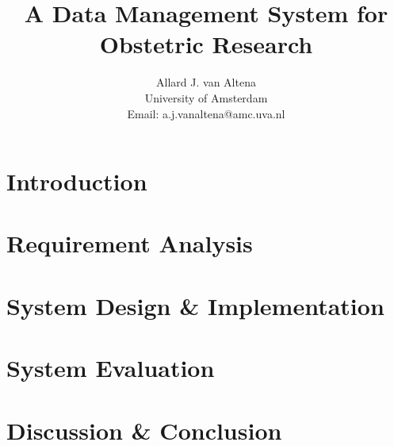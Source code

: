 \documentclass[a4paper]{report}
\title{A Data Management System for Obstetric Research}
\author{
	Allard J. van Altena\\
	University of Amsterdam\\
	Email: a.j.vanaltena@amc.uva.nl
}
\begin{document}
	
	\tableofcontents
	
	\chapter{Introduction}
	\label{introduction}
	
	
	
	
	
	\chapter{Requirement Analysis}
	\label{requirements}
	
	
	
	
	
	
	
	
	
	
	
	
	\chapter{System Design \& Implementation}
	\label{system-functionality}
	
	
	
	
	
	
	
	
	\chapter{System Evaluation}
	\label{evaluation}
	
	
	
	
	\chapter{Discussion \& Conclusion}
	\label{discussion}
	
\end{document}
